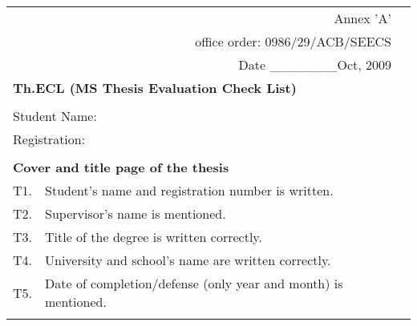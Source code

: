 \begin{table}[]
\begin{tabular}{lll}
               & \multicolumn{1}{r}{Annex 'A'}                                                                                   &  \\
               & \multicolumn{1}{r}{office order: 0986/29/ACB/SEECS}                                                             &  \\
               & \multicolumn{1}{r}{Date \_\_\_\_\_\_\_Oct, 2009}                                                                &  \\
\multicolumn{2}{l}{\textbf{Th.ECL (MS Thesis   Evaluation Check List)}}                                                          &  \\
               &                                                                                                                 &  \\
\multicolumn{2}{l}{Student  Name:}                                                                                               &  \\
\multicolumn{2}{l}{Registration:}                                                                                                &  \\
               &                                                                                                                 &  \\
\multicolumn{2}{l}{\textbf{Cover and title   page of the thesis}}                                                                &  \\
T1.            & Student's name and registration   number is written.                                                            &  \\
T2.            & Supervisor's name is   mentioned.                                                                               &  \\
T3.            & Title of the degree   is written correctly.                                                                     &  \\
T4.            & University and   school's name are written correctly.                                                           &  \\
T5.            & Date of   completion/defense (only year and month) is mentioned.                                                &  \\
               &                                                                                                                 &  \\

\end{tabular}
\end{table}

